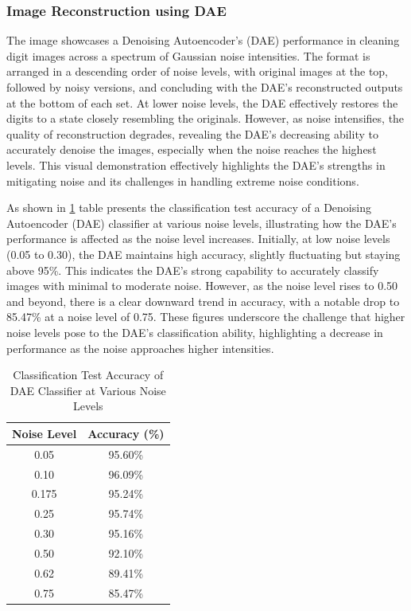 \subsubsection{Image Reconstruction using DAE}
The image showcases a Denoising Autoencoder's (DAE) performance in cleaning digit images across a spectrum of Gaussian noise intensities. The format is arranged in a descending order of noise levels, with original images at the top, followed by noisy versions, and concluding with the DAE's reconstructed outputs at the bottom of each set. At lower noise levels, the DAE effectively restores the digits to a state closely resembling the originals. However, as noise intensifies, the quality of reconstruction degrades, revealing the DAE's decreasing ability to accurately denoise the images, especially when the noise reaches the highest levels. This visual demonstration effectively highlights the DAE's strengths in mitigating noise and its challenges in handling extreme noise conditions.



As shown in \ref{tab:dae_classifier_accuracy}  table presents the classification test accuracy of a Denoising Autoencoder (DAE) classifier at various noise levels, illustrating how the DAE's performance is affected as the noise level increases. Initially, at low noise levels (0.05 to 0.30), the DAE maintains high accuracy, slightly fluctuating but staying above 95\%. This indicates the DAE's strong capability to accurately classify images with minimal to moderate noise. However, as the noise level rises to 0.50 and beyond, there is a clear downward trend in accuracy, with a notable drop to 85.47\% at a noise level of 0.75. These figures underscore the challenge that higher noise levels pose to the DAE's classification ability, highlighting a decrease in performance as the noise approaches higher intensities.

\begin{table}[ht]
\centering
\begin{tabular}{c|c}
\toprule
\textbf{Noise Level} & \textbf{Accuracy (\%)} \\
\midrule
0.05 & 95.60\% \\
0.10 & 96.09\% \\
0.175 & 95.24\% \\
0.25 & 95.74\% \\
0.30 & 95.16\% \\
0.50 & 92.10\% \\
0.62 & 89.41\% \\
0.75 & 85.47\% \\
\bottomrule
\end{tabular}
\caption{Classification Test Accuracy of DAE Classifier at Various Noise Levels}
\label{tab:dae_classifier_accuracy}
\end{table}

